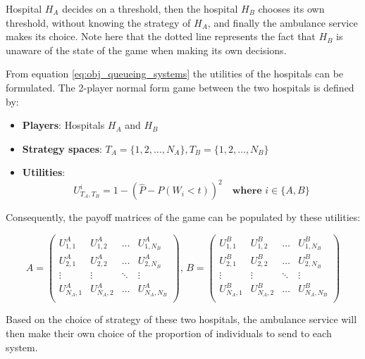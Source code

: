 Hospital \(H_A\) decides on a threshold, then the hospital \(H_B\)
chooses its own threshold, without knowing the strategy of \(H_A\), and finally
the ambulance service makes its choice. 
Note here that the dotted line represents the
fact that \(H_B\) is unaware of the state of the game when making its own 
decisions. 

From equation \ref{eq:obj_queueing_systems} the utilities of the
hospitals can be formulated.
The 2-player normal form game between the two hospitals is defined by:
\begin{itemize}
    \item \textbf{Players}: Hospitals \(H_A\) and \(H_B\)
    \item \textbf{Strategy spaces}: \(T_A = \{1, 2, \dots, N_A\}, 
    T_B = \{1, 2, \dots, N_B\}\)
    \item \textbf{Utilities}:    
    \begin{equation} \label{eq:payoff_entry}
        U_{T_A, T_B}^i = 1 - \left( \hat{P} - P(W_i < t) \right)^2 \quad
        \textbf{where } i \in \{A, B\}
    \end{equation}
\end{itemize}

Consequently, the payoff matrices of the game can be populated by these 
utilities:

\begin{equation} \label{eq:payoff_matrices}
    A = 
    \begin{pmatrix}
        U_{1,1}^A & U_{1,2}^A & \dots & U_{1,N_B}^A \\
        U_{2,1}^A & U_{2,2}^A & \dots & U_{2,N_B}^A \\
        \vdots & \vdots & \ddots & \vdots \\
        U_{N_A,1}^A & U_{N_A,2}^A & \dots & U_{N_A,N_B}^A \\
    \end{pmatrix}, \,
    B = 
    \begin{pmatrix}
        U_{1,1}^B & U_{1,2}^B & \dots & U_{1,N_B}^B \\
        U_{2,1}^B & U_{2,2}^B & \dots & U_{2,N_B}^B \\
        \vdots & \vdots & \ddots & \vdots \\
        U_{N_A,1}^B & U_{N_A,2}^B & \dots & U_{N_A,N_B}^B \\
    \end{pmatrix}
\end{equation}

Based on the choice of strategy of these two hospitals, the ambulance service 
will then make their own choice of the proportion of individuals to send to
each system.




